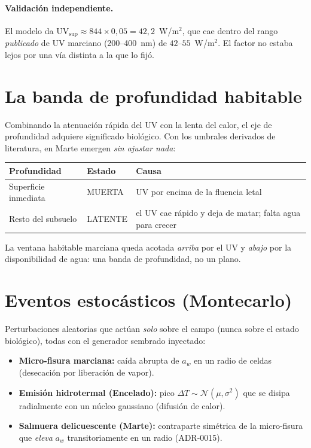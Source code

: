 \documentclass[11pt]{article}
\begin{document}
\paragraph{Validación independiente.} El modelo da $\mathrm{UV}_{\mathrm{sup}}
\approx 844\times 0{,}05 = 42{,}2$~W/m$^2$, que cae dentro del rango
\emph{publicado} de UV marciano (200--400~nm) de $42$--$55$~W/m$^2$. El factor no
estaba lejos por una vía distinta a la que lo fijó.

\section{La banda de profundidad habitable}

Combinando la atenuación rápida del UV con la lenta del calor, el eje de
profundidad adquiere significado biológico. Con los umbrales derivados de
literatura, en Marte emergen \emph{sin ajustar nada}:
\begin{center}\small
\begin{tabular}{@{}lll@{}}
\toprule
Profundidad & Estado & Causa \\
\midrule
Superficie inmediata & \textsf{MUERTA} & UV por encima de la fluencia letal \\
Resto del subsuelo & \textsf{LATENTE} & el UV cae rápido y deja de matar; falta agua para crecer \\
\bottomrule
\end{tabular}
\end{center}
La ventana habitable marciana queda acotada \emph{arriba} por el UV y \emph{abajo}
por la disponibilidad de agua: una banda de profundidad, no un plano.

\section{Eventos estocásticos (Montecarlo)}

Perturbaciones aleatorias que actúan \emph{solo} sobre el campo (nunca sobre el
estado biológico), todas con el generador sembrado inyectado:
\begin{itemize}[nosep]
  \item \textbf{Micro-fisura marciana:} caída abrupta de $a_w$ en un radio de
  celdas (desecación por liberación de vapor).
  \item \textbf{Emisión hidrotermal (Encelado):} pico $\Delta T\sim\mathcal{N}(\mu,\sigma^2)$
  que se disipa radialmente con un núcleo gaussiano (difusión de calor).
  \item \textbf{Salmuera delicuescente (Marte):} contraparte simétrica de la
  micro-fisura que \emph{eleva} $a_w$ transitoriamente en un radio (ADR-0015).
\end{itemize}
\end{document}
